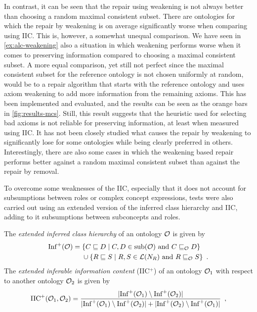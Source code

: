 In contrast, it can be seen that the repair using weakening is not always better than choosing a random maximal consistent subset. There are ontologies for which the repair by weakening is on average significantly worse when comparing using IIC. This is, however, a somewhat unequal comparison. We have seen in \cref{ex:alc-weakening} also a situation in which weakening performs worse when it comes to preserving information compared to choosing a maximal consistent subset. A more equal comparison, yet still not perfect since the maximal consistent subset for the reference ontology is not chosen uniformly at random, would be to a repair algorithm that starts with the reference ontology and uses axiom weakening to add more information from the remaining axioms. This has been implemented and evaluated, and the results can be seen as the orange bars in \cref{fig:results-mcs}. Still, this result suggests that the heuristic used for selecting bad axioms is not reliable for preserving information, at least when measured using IIC. It has not been closely studied what causes the repair by weakening to significantly lose for some ontologies while being clearly preferred in others. Interestingly, there are also some cases in which the weakening based repair performs better against a random maximal consistent subset than against the repair by removal.

To overcome some weaknesses of the IIC, especially that it does not account for subsumptions between roles or complex concept expressions, tests were also carried out using an extended version of the inferred class hierarchy and IIC, adding to it subsumptions between subconcepts and roles.

\begin{definition}
  The \emph{extended inferred class hierarchy} of an ontology $\mathcal{O}$ is given by
  \begin{align*}
    {\ensuremath{\operatorname{Inf}}}^+(\mathcal{O}) ={} & \{ C \sqsubseteq D \mid C, D \in {\ensuremath{\operatorname{sub}}}(\mathcal{O}) \text{ and } C \sqsubseteq_\mathcal{O} D \} \\
    & \cup \{ R \sqsubseteq S \mid R, S \in \mathcal{L}(N_R) \text{ and } R \sqsubseteq_\mathcal{O} S \} \enspace.
  \end{align*}
  The \emph{extended inferable information content} (IIC$^+$) of an ontology $\mathcal{O}_1$ with respect to another ontology $\mathcal{O}_2$ is given by
  \begin{align*}
    {\ensuremath{\operatorname{IIC}}}^+(\mathcal{O}_1, \mathcal{O}_2) = \frac{| {\operatorname{Inf}}^+(\mathcal{O}_1) \setminus {\ensuremath{\operatorname{Inf}}}^+(\mathcal{O}_2) |}{|{\operatorname{Inf}}^+(\mathcal{O}_1) \setminus {\ensuremath{\operatorname{Inf}}}^+(\mathcal{O}_2)| + |{\operatorname{Inf}}^+(\mathcal{O}_2) \setminus {\ensuremath{\operatorname{Inf}}}^+(\mathcal{O}_1)|} \enspace,
  \end{align*}
\end{definition}

